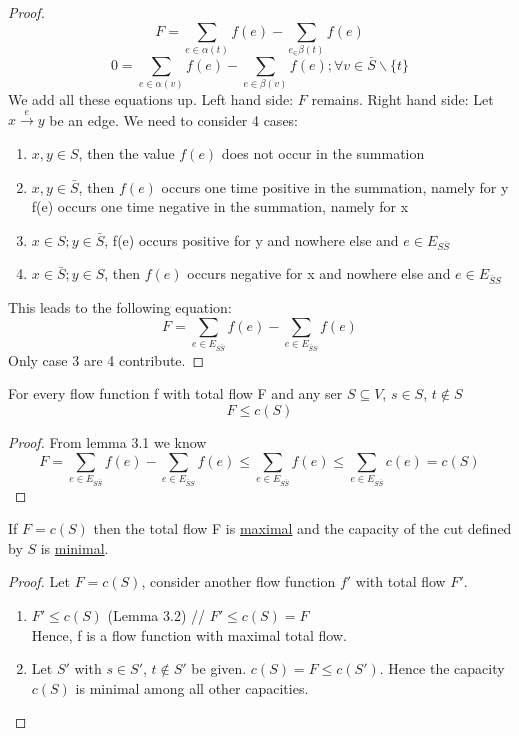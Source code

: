 \begin{proof}
\[ F = \sum_{e \in \alpha(t)} f(e) - \sum_{e_ \in \beta(t)} f(e) \]
\[0 = \sum_{e \in \alpha(v)} f(e) - \sum_{e \in \beta(v)} f(e); \forall v \in \bar{S} \backslash \{t\} \]
We add all these equations up. Left hand side: $F$ remains. Right hand side: Let $x \xrightarrow{e} y$ be an edge. We need to consider 4 cases:
\begin{enumerate}
\item $x, y \in S$, then the value $f(e)$ does not occur in the summation
\item $x, y \in \bar{S}$, then $f(e)$ occurs one time positive in the summation, namely for y \\ f(e) occurs one time negative in the summation, namely for x 
\item $x \in S; y \in \bar{S}$, f(e) occurs positive for y and nowhere else and $e \in E_{S\bar{S}}$
\item $x \in \bar{S}; y \in S$, then $f(e)$ occurs negative for x and nowhere else and $e \in E_{\bar{S}S}$
\end{enumerate}
This leads to the following equation:
\[F = \sum_{e \in E_{S\bar{S}}}f(e) - \sum_{e \in E_{\bar{S}S}} f(e) \]
Only case 3 are 4 contribute.
\end{proof}

\begin{lemma}
For every flow function f with total flow F and any ser $S \subseteq V$, $s \in S$, $t \notin S$
$$ F \le c(S) $$
\end{lemma}

\begin{proof}
From lemma 3.1 we know
\[F = \sum_{e \in E_{S\bar{S}}}f(e) - \sum_{e \in E_{\bar{S}S}}f(e) \le \sum_{e \in E_{S\bar{S}}}f(e) \le \sum_{e \in E_{S\bar{S}}}c(e) = c(S) \] 
\end{proof}

\begin{corollary}
If $F=c(S)$ then the total flow F is \underline{maximal} and the capacity of the cut defined by $S$ is \underline{minimal}.
\end{corollary}

\begin{proof}
Let $F = c(S)$, consider another flow function $f'$ with total flow $F'$.
\begin{enumerate}
\item $F' \le c(S)$ (Lemma 3.2) // $F' \le c(S) = F$ \\Hence, f is a flow function with maximal total flow.
\item Let $S'$ with $s \in S'$, $t \notin S'$ be given. $c(S) = F \le c(S')$. Hence the capacity $c(S)$ is minimal among all other capacities. 
\end{enumerate}
\end{proof}

